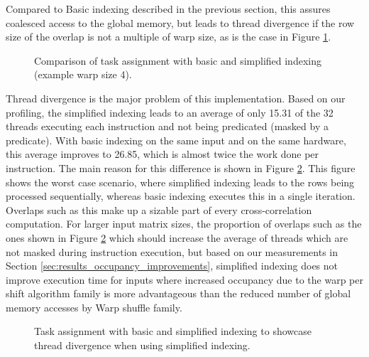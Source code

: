Compared to Basic indexing described in the previous section, this assures coalesced access to the global memory, but leads to thread divergence if the row size of the overlap is not a multiple of warp size, as is the case in Figure \ref{fig:warp_per_shift_simplified_indexing}. 

\begin{figure}[ht]
	\centering
	\def\svgwidth{0.5\textwidth}
	\fontsize{8}{10}\selectfont
	
	\caption{Comparison of task assignment with basic and simplified indexing (example warp size 4).}
	\label{fig:warp_per_shift_simplified_indexing}
\end{figure}

Thread divergence is the major problem of this implementation. Based on our profiling, the simplified indexing leads to an average of only 15.31 of the 32 threads executing each instruction and not being predicated (masked by a predicate). With basic indexing on the same input and on the same hardware, this average improves to 26.85, which is almost twice the work done per instruction. The main reason for this difference is shown in Figure \ref{fig:warp_per_shift_thread_divergence}. This figure shows the worst case scenario, where simplified indexing leads to the rows being processed sequentially, whereas basic indexing executes this in a single iteration. Overlaps such as this make up a sizable part of every cross-correlation computation. For larger input matrix sizes, the proportion of overlaps such as the ones shown in Figure \ref{fig:warp_per_shift_thread_divergence} which should increase the average of threads which are not masked during instruction execution, but based on our measurements in Section \ref{sec:results_occupancy_improvements}, simplified indexing does not improve execution time for inputs where increased occupancy due to the warp per shift algorithm family is more advantageous than the reduced number of global memory accesses by Warp shuffle family.

\begin{figure}[ht]
	\centering
	\def\svgwidth{0.45\textwidth}
	\fontsize{8}{10}\selectfont
	
	\caption{Task assignment with basic and simplified indexing to showcase thread divergence when using simplified indexing.}
	\label{fig:warp_per_shift_thread_divergence}
\end{figure}

